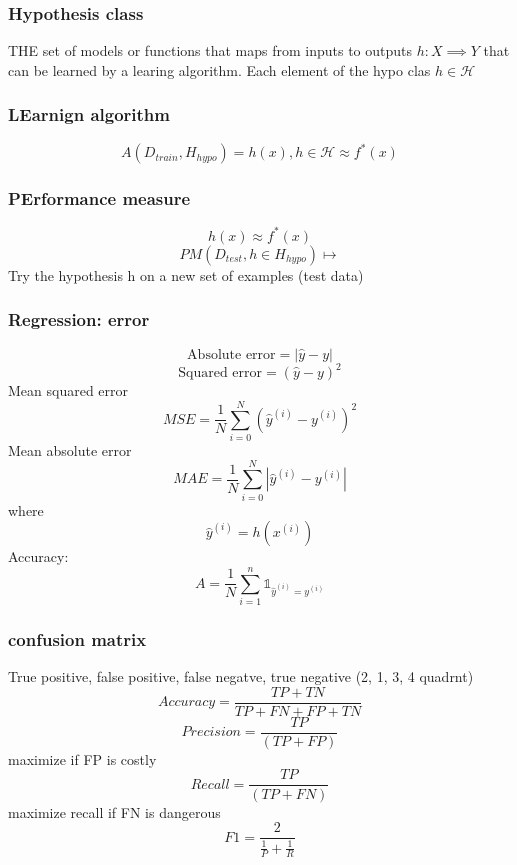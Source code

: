 \documentclass{article}
\begin{document}
\subsubsection*{Hypothesis class}
THE set of models or functions that maps from inputs to outputs $h:X \implies Y$ that can be learned by a learing algorithm. 
Each element of the hypo clas $h \in \mathcal{H}$ 
\subsubsection*{LEarnign algorithm }
\[A(D_{train}, H_{hypo}) = h(x),  h\in \mathcal{H} \approx f^*(x)\]
\subsubsection*{PErformance measure}
\[h(x) \approx f^*(x)\]
\[PM(D_{test}, h \in H_{hypo}) \mapsto \]
Try the hypothesis h on a new set of examples (test data)\\

\subsubsection*{Regression: error}
\begin{equation}
    \text{Absolute error} = |\hat{y} - y|
\end{equation}
\begin{equation}
    \text{Squared error} = (\hat{y} - y)^2 
\end{equation}
Mean squared error
\[MSE = \frac{1}{N} \sum_{i=0}^{N}(\hat{y}^{(i)} - y^{(i)})^2 \]
Mean absolute error
\[MAE = \frac{1}{N} \sum_{i=0}^{N}|\hat{y}^{(i)} - y^{(i)}| \]
where 
\[\hat{y}^{(i)} = h(x^{(i)})\]
Accuracy: 
\[A = \frac{1}{N} \sum_{i=1}^{n} \mathds{1}_{\hat{y}^{(i)} = y^{(i)}}\]



\subsubsection*{confusion matrix}
True positive, false positive, false negatve, true negative (2, 1, 3, 4 quadrnt)\newline
\[Accuracy = \frac{TP + TN}{TP + FN + FP + TN}\]
\[Precision = \frac{TP}{(TP + FP)}\]
maximize if FP is costly
\[Recall = \frac{TP}{(TP + FN)}\]
maximize recall if FN is dangerous
\[F1 = \frac{2}{\frac{1}{P} + \frac{1}{R}}\]
\end{document}
